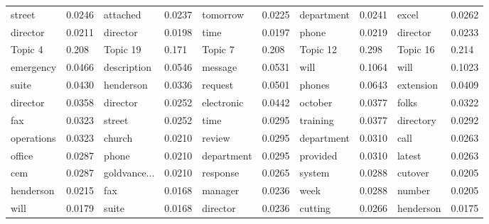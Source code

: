 \documentclass[a4paper]{article}
\begin{document}
\begin{table}[ht]
\begin{tabular}{|l|l||l|l||l|l||l|l||l|l|}
		\scriptsize street&\scriptsize 0.0246&\scriptsize attached&\scriptsize 0.0237&\scriptsize tomorrow&\scriptsize 0.0225&\scriptsize department&\scriptsize 0.0241&\scriptsize excel&\scriptsize 0.0262\\
		\scriptsize director&\scriptsize 0.0211&\scriptsize director&\scriptsize  0.0198&\scriptsize time&\scriptsize 0.0197&\scriptsize phone&\scriptsize 0.0219&\scriptsize director&\scriptsize0.0233\\
		\hline\hline
		Topic 4&0.208&Topic 19&0.171&Topic 7 &0.208& Topic 12 & 0.298 & Topic 16 & 0.214 \\
		\hline
		\scriptsize emergency&\scriptsize 0.0466&\scriptsize description&\scriptsize 0.0546&\scriptsize message&\scriptsize 0.0531&\scriptsize will&\scriptsize 0.1064&\scriptsize will&\scriptsize 0.1023\\
		\scriptsize suite&\scriptsize0.0430&\scriptsize henderson&\scriptsize 0.0336&\scriptsize request&\scriptsize 0.0501&\scriptsize phones&\scriptsize 0.0643&\scriptsize extension&\scriptsize  0.0409\\
		\scriptsize director&\scriptsize 0.0358&\scriptsize director&\scriptsize 0.0252&\scriptsize electronic&\scriptsize 0.0442&\scriptsize october&\scriptsize 0.0377&\scriptsize folks&\scriptsize 0.0322\\
		\scriptsize fax&\scriptsize 0.0323&\scriptsize street&\scriptsize  0.0252&\scriptsize time&\scriptsize 0.0295&\scriptsize training&\scriptsize 0.0377&\scriptsize directory&\scriptsize 0.0292\\
		\scriptsize operations&\scriptsize 0.0323&\scriptsize church&\scriptsize 0.0210&\scriptsize review&\scriptsize 0.0295&\scriptsize department&\scriptsize 0.0310&\scriptsize call&\scriptsize 0.0263\\
		\scriptsize office&\scriptsize 0.0287&\scriptsize phone&\scriptsize 0.0210&\scriptsize department&\scriptsize 0.0295&\scriptsize provided&\scriptsize 0.0310&\scriptsize latest&\scriptsize 0.0263\\
		\scriptsize cem&\scriptsize 0.0287&\scriptsize goldvance...&\scriptsize 0.0210&\scriptsize response&\scriptsize0.0265&\scriptsize  system&\scriptsize 0.0288&\scriptsize cutover&\scriptsize 0.0205\\
		\scriptsize henderson&\scriptsize 0.0215&\scriptsize fax&\scriptsize 0.0168&\scriptsize manager&\scriptsize 0.0236&\scriptsize week&\scriptsize 0.0288&\scriptsize number&\scriptsize  0.0205\\
		\scriptsize will&\scriptsize 0.0179&\scriptsize suite&\scriptsize 0.0168&\scriptsize director&\scriptsize 0.0236&\scriptsize cutting&\scriptsize 0.0266&\scriptsize henderson&\scriptsize 0.0175\\

\end{tabular}
\end{table}
\end{document}

